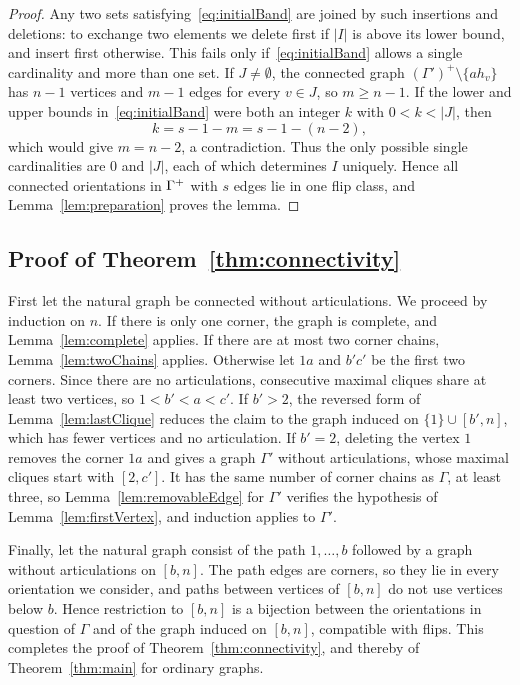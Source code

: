 \begin{proof}
Any two sets satisfying~\eqref{eq:initialBand} are joined by such insertions and
deletions: to exchange two elements we delete first if $|I|$ is above its lower
bound, and insert first otherwise.
This fails only if~\eqref{eq:initialBand} allows a single cardinality and more
than one set.
If $J\neq\emptyset$, the connected graph
$(\Gamma')^+\setminus\{ah_v\}$ has $n-1$ vertices and $m-1$ edges for every
$v\in J$, so $m\geq n-1$.
If the lower and upper bounds in~\eqref{eq:initialBand} were both an integer
$k$ with $0<k<|J|$, then
\[
 k=s-1-m=s-1-(n-2),
\]
which would give $m=n-2$, a contradiction.
Thus the only possible single cardinalities are $0$ and $|J|$, each of which
determines $I$ uniquely.
Hence all connected orientations in $\Gamma^{+}$ with $s$ edges lie in one flip
class, and Lemma~\ref{lem:preparation} proves the lemma.
\end{proof}

\subsection{Proof of Theorem~\ref{thm:connectivity}}

First let the natural graph be connected without articulations.
We proceed by induction on $n$.
If there is only one corner, the graph is complete, and Lemma~\ref{lem:complete}
applies.
If there are at most two corner chains, Lemma~\ref{lem:twoChains} applies.
Otherwise let $1a$ and $b'c'$ be the first two corners.
Since there are no articulations, consecutive maximal cliques share at least two
vertices, so $1<b'<a<c'$.
If $b'>2$, the reversed form of Lemma~\ref{lem:lastClique} reduces the claim to the
graph induced on $\{1\}\cup[b',n]$, which has fewer vertices and no
articulation.
If $b'=2$, deleting the vertex $1$ removes the corner $1a$ and gives a graph
$\Gamma'$ without articulations, whose maximal cliques start with $[2,c']$.
It has the same number of corner chains as $\Gamma$, at least three, so
Lemma~\ref{lem:removableEdge} for $\Gamma'$ verifies the hypothesis of
Lemma~\ref{lem:firstVertex}, and induction applies to $\Gamma'$.

Finally, let the natural graph consist of the path $1,\dotsc,b$ followed by a
graph without articulations on $[b,n]$.
The path edges are corners, so they lie in every orientation we consider, and
paths between vertices of $[b,n]$ do not use vertices below $b$.
Hence restriction to $[b,n]$ is a bijection between the orientations in question
of $\Gamma$ and of the graph induced on $[b,n]$, compatible with flips.
This completes the proof of Theorem~\ref{thm:connectivity}, and thereby of
Theorem~\ref{thm:main} for ordinary graphs.
